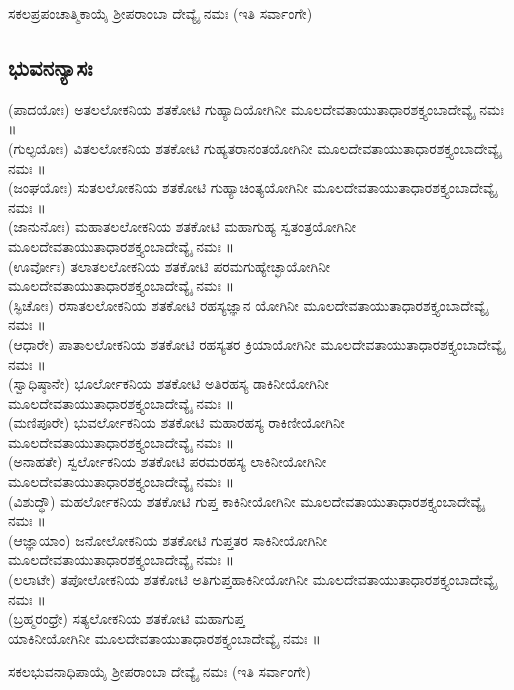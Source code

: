   ಸಕಲಪ್ರಪಂಚಾತ್ಮಿಕಾಯೈ  ಶ್ರೀಪರಾಂಬಾ ದೇವ್ಯೈ ನಮಃ (ಇತಿ ಸರ್ವಾಂಗೇ)
\subsection{ಭುವನನ್ಯಾಸಃ} 
(ಪಾದಯೋಃ)  ಅತಲಲೋಕನಿಯ ಶತಕೋಟಿ ಗುಹ್ಯಾದಿಯೋಗಿನೀ ಮೂಲದೇವತಾಯುತಾಧಾರಶಕ್ತ್ಯಂಬಾದೇವ್ಯೈ ನಮಃ ॥\\
(ಗುಲ್ಫಯೋಃ)  ವಿತಲಲೋಕನಿಯ ಶತಕೋಟಿ ಗುಹ್ಯತರಾನಂತಯೋಗಿನೀ ಮೂಲದೇವತಾಯುತಾಧಾರಶಕ್ತ್ಯಂಬಾದೇವ್ಯೈ ನಮಃ ॥\\
(ಜಂಘಯೋಃ)  ಸುತಲಲೋಕನಿಯ ಶತಕೋಟಿ ಗುಹ್ಯಾಚಿಂತ್ಯಯೋಗಿನೀ ಮೂಲದೇವತಾಯುತಾಧಾರಶಕ್ತ್ಯಂಬಾದೇವ್ಯೈ ನಮಃ ॥\\
(ಜಾನುನೋಃ)  ಮಹಾತಲಲೋಕನಿಯ ಶತಕೋಟಿ ಮಹಾಗುಹ್ಯ ಸ್ವತಂತ್ರಯೋಗಿನೀ ಮೂಲದೇವತಾಯುತಾಧಾರಶಕ್ತ್ಯಂಬಾದೇವ್ಯೈ ನಮಃ ॥\\
(ಊರ್ವೋಃ)  ತಲಾತಲಲೋಕನಿಯ ಶತಕೋಟಿ ಪರಮಗುಹ್ಯೇಚ್ಛಾಯೋಗಿನೀ ಮೂಲದೇವತಾಯುತಾಧಾರಶಕ್ತ್ಯಂಬಾದೇವ್ಯೈ ನಮಃ ॥\\
(ಸ್ಫಿಚೋಃ) ರಸಾತಲಲೋಕನಿಯ ಶತಕೋಟಿ ರಹಸ್ಯಜ್ಞಾನ ಯೋಗಿನೀ ಮೂಲದೇವತಾಯುತಾಧಾರಶಕ್ತ್ಯಂಬಾದೇವ್ಯೈ ನಮಃ ॥\\
(ಆಧಾರೇ)  ಪಾತಾಲಲೋಕನಿಯ ಶತಕೋಟಿ ರಹಸ್ಯತರ ಕ್ರಿಯಾಯೋಗಿನೀ ಮೂಲದೇವತಾಯುತಾಧಾರಶಕ್ತ್ಯಂಬಾದೇವ್ಯೈ ನಮಃ ॥\\
(ಸ್ವಾಧಿಷ್ಠಾನೇ)  ಭೂರ್ಲೋಕನಿಯ ಶತಕೋಟಿ ಅತಿರಹಸ್ಯ ಡಾಕಿನೀಯೋಗಿನೀ ಮೂಲದೇವತಾಯುತಾಧಾರಶಕ್ತ್ಯಂಬಾದೇವ್ಯೈ ನಮಃ ॥\\
(ಮಣಿಪೂರೇ)  ಭುವರ್ಲೋಕನಿಯ ಶತಕೋಟಿ ಮಹಾರಹಸ್ಯ ರಾಕಿಣೀಯೋಗಿನೀ ಮೂಲದೇವತಾಯುತಾಧಾರಶಕ್ತ್ಯಂಬಾದೇವ್ಯೈ ನಮಃ ॥\\
(ಅನಾಹತೇ)  ಸ್ವರ್ಲೋಕನಿಯ ಶತಕೋಟಿ ಪರಮರಹಸ್ಯ ಲಾಕಿನೀಯೋಗಿನೀ ಮೂಲದೇವತಾಯುತಾಧಾರಶಕ್ತ್ಯಂಬಾದೇವ್ಯೈ ನಮಃ ॥\\
(ವಿಶುದ್ಧೌ)  ಮಹರ್ಲೋಕನಿಯ ಶತಕೋಟಿ ಗುಪ್ತ ಕಾಕಿನೀಯೋಗಿನೀ ಮೂಲದೇವತಾಯುತಾಧಾರಶಕ್ತ್ಯಂಬಾದೇವ್ಯೈ ನಮಃ ॥\\
(ಆಜ್ಞಾಯಾಂ)  ಜನೋಲೋಕನಿಯ ಶತಕೋಟಿ ಗುಪ್ತತರ ಸಾಕಿನೀಯೋಗಿನೀ ಮೂಲದೇವತಾಯುತಾಧಾರಶಕ್ತ್ಯಂಬಾದೇವ್ಯೈ ನಮಃ ॥\\
(ಲಲಾಟೇ)  ತಪೋಲೋಕನಿಯ ಶತಕೋಟಿ ಅತಿಗುಪ್ತಹಾಕಿನೀಯೋಗಿನೀ ಮೂಲದೇವತಾಯುತಾಧಾರಶಕ್ತ್ಯಂಬಾದೇವ್ಯೈ ನಮಃ ॥\\
(ಬ್ರಹ್ಮರಂಧ್ರೇ)  ಸತ್ಯಲೋಕನಿಯ ಶತಕೋಟಿ ಮಹಾಗುಪ್ತ\\ ಯಾಕಿನೀಯೋಗಿನೀ ಮೂಲದೇವತಾಯುತಾಧಾರಶಕ್ತ್ಯಂಬಾದೇವ್ಯೈ ನಮಃ ॥

  ಸಕಲಭುವನಾಧಿಪಾಯೈ  ಶ್ರೀಪರಾಂಬಾ ದೇವ್ಯೈ ನಮಃ  (ಇತಿ ಸರ್ವಾಂಗೇ)

